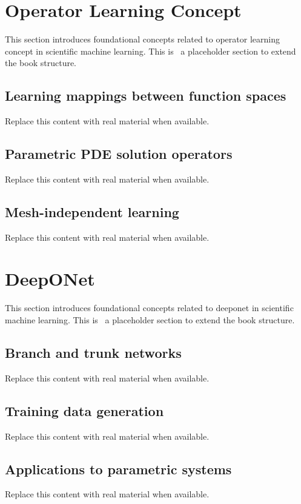 
\section{Operator Learning Concept}
This section introduces foundational concepts related to operator learning concept in scientific machine learning. This is~\cite{abdulmaksoudTransformerBasedSensorFusion2025} a placeholder section to extend the book structure.

\subsection{Learning mappings between function spaces}
Replace this content with real material when available.

\subsection{Parametric PDE solution operators}
Replace this content with real material when available.

\subsection{Mesh-independent learning}
Replace this content with real material when available.

\section{DeepONet}
This section introduces foundational concepts related to deeponet in scientific machine learning. This is~\cite{abdulmaksoudTransformerBasedSensorFusion2025} a placeholder section to extend the book structure.

\subsection{Branch and trunk networks}
Replace this content with real material when available.

\subsection{Training data generation}
Replace this content with real material when available.

\subsection{Applications to parametric systems}
Replace this content with real material when available.

